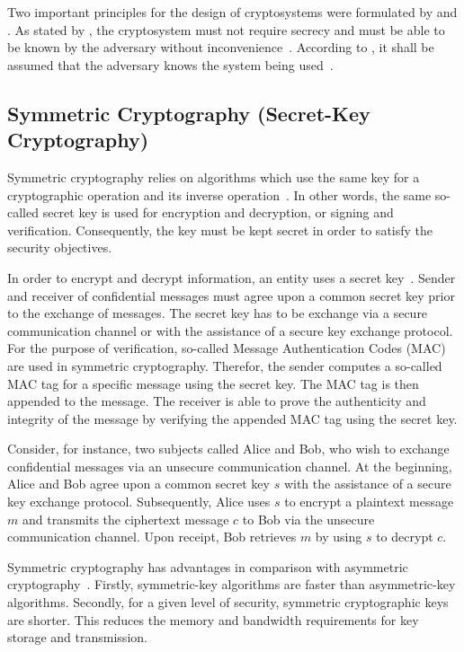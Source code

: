 Two important principles for the design of cryptosystems were formulated by \citeauthor{Kerckhoffs1883} and \citeauthor{Shannon1949}.
As stated by \citeauthor{Kerckhoffs1883}, the cryptosystem must not require secrecy and must be able to be known by the adversary without inconvenience~\cite{Kerckhoffs1883}.
According to \citeauthor{Shannon1949}, it shall be assumed that the adversary knows the system being used~\cite{Shannon1949}.

\subsection{Symmetric Cryptography (Secret-Key Cryptography)}
Symmetric cryptography relies on algorithms which use the same key for a cryptographic operation and its inverse operation~\cite{Barker2020,Eckert2023}.
In other words, the same so-called secret key is used for encryption and decryption, or signing and verification.
Consequently, the key must be kept secret in order to satisfy the security objectives.

In order to encrypt and decrypt information, an entity uses a secret key~\cite{Boneh2023}.
Sender and receiver of confidential messages must agree upon a common secret key prior to the exchange of messages.
The secret key has to be exchange via a secure communication channel or with the assistance of a secure key exchange protocol.
For the purpose of verification, so-called Message Authentication Codes (MAC) are used in symmetric cryptography.
Therefor, the sender computes a so-called MAC tag for a specific message using the secret key.
The MAC tag is then appended to the message.
The receiver is able to prove the authenticity and integrity of the message by verifying the appended MAC tag using the secret key.

Consider, for instance, two subjects called Alice and Bob, who wish to exchange confidential messages via an unsecure communication channel.
At the beginning, Alice and Bob agree upon a common secret key $s$ with the assistance of a secure key exchange protocol.
Subsequently, Alice uses $s$ to encrypt a plaintext message $m$ and transmits the ciphertext message $c$ to Bob via the unsecure communication channel.
Upon receipt, Bob retrieves $m$ by using $s$ to decrypt $c$.

Symmetric cryptography has advantages in comparison with asymmetric cryptography~\cite{Barker2020}.
Firstly, symmetric-key algorithms are faster than asymmetric-key algorithms.
Secondly, for a given level of security, symmetric cryptographic keys are shorter.
This reduces the memory and bandwidth requirements for key storage and transmission.

